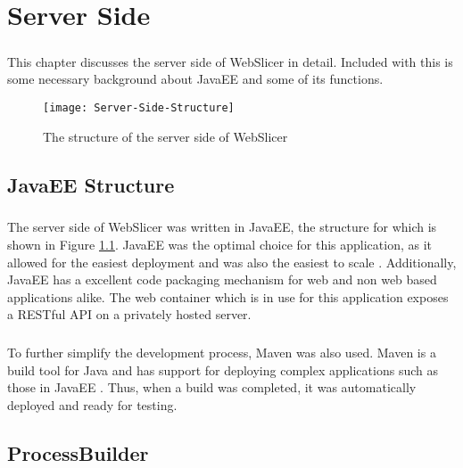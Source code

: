 \chapter{Server Side}
\paragraph{}
This chapter discusses the server side of WebSlicer in detail. 
Included with this is some necessary background about JavaEE and some of its functions.

\begin{figure}[!ht]
  \centering
  \texttt{[image: Server-Side-Structure]}
  \caption{The structure of the server side of WebSlicer}
  \label{fig:server-side-structure}
\end{figure}

\section{JavaEE Structure}
\paragraph{}
The server side of WebSlicer was written in JavaEE, the structure for which is shown in Figure \ref{fig:server-side-structure}.
JavaEE was the optimal choice for this application, as it allowed for the easiest deployment and was also the easiest to scale \citep{pilgrim-2013}.
Additionally, JavaEE has a excellent code packaging mechanism for web and non web based applications alike.
The web container which is in use for this application exposes a RESTful API on a privately hosted server.

\paragraph{}
To further simplify the development process, Maven was also used.
Maven is a build tool for Java and has support for deploying complex applications such as those in JavaEE \citep{massol-2005}.
Thus, when a build was completed, it was automatically deployed and ready for testing.

\section{ProcessBuilder}
